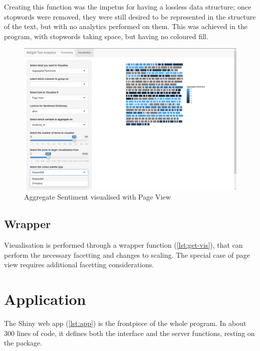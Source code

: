 \message{ !name(jason-cairns-dissertation.tex)}\documentclass[11pt, a4paper, titlepage]{report}
\begin{document}
Creating this function was the impetus for having a lossless data
structure; once stopwords were removed, they were still desired to be
represented in the structure of the text, but with no analytics
performed on them. This was achieved in the program, with stopwords
taking space, but having no coloured fill.

\begin{figure}
\centering
\includegraphics[scale=0.35]{visualisation-agg-sent-pageview.png}
\caption{Aggregate Sentiment visualised with Page View\label{fig:visualisation-agg-sent-pageview}}
\end{figure}

\subsection{Wrapper}\label{sec:wrapper-1}

Visualisation is performed through a wrapper function
(\cref{lst:get-vis}), that can perform the necessary facetting
and changes to scaling. The special case of page view requires
additional facetting considerations.

\section{Application}\label{sec:application}

The Shiny web app (\cref{lst:app}) is the frontpiece of the
whole program. In about 300 lines of code, it defines both the
interface and the server functions, resting on the package.
\end{document}
